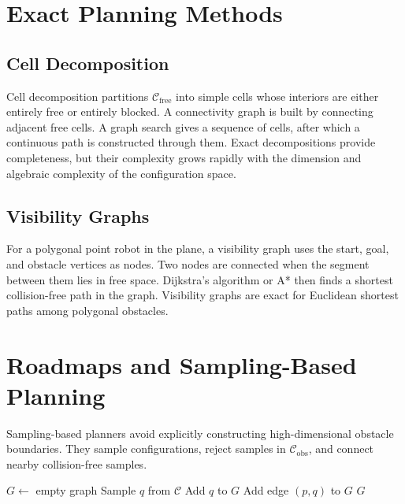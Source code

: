\section{Exact Planning Methods}
\label{sec:exact_motion_planning}

\subsection{Cell Decomposition}

Cell decomposition partitions $\mathcal{C}_{\mathrm{free}}$ into simple cells
whose interiors are either entirely free or entirely blocked. A connectivity
graph is built by connecting adjacent free cells. A graph search gives a
sequence of cells, after which a continuous path is constructed through them.
Exact decompositions provide completeness, but their complexity grows rapidly
with the dimension and algebraic complexity of the configuration space.

\subsection{Visibility Graphs}

For a polygonal point robot in the plane, a visibility graph uses the start,
goal, and obstacle vertices as nodes. Two nodes are connected when the segment
between them lies in free space. Dijkstra's algorithm or A* then finds a
shortest collision-free path in the graph. Visibility graphs are exact for
Euclidean shortest paths among polygonal obstacles.

\section{Roadmaps and Sampling-Based Planning}
\label{sec:sampling_motion_planning}

Sampling-based planners avoid explicitly constructing high-dimensional
obstacle boundaries. They sample configurations, reject samples in
$\mathcal{C}_{\mathrm{obs}}$, and connect nearby collision-free samples.

\begin{algorithm}[htbp]
\caption{Probabilistic Roadmap Planner}
\label{alg:probabilistic_roadmap}
\begin{algorithmic}[1]
  \State $G\gets$ empty graph
    \State Sample $q$ from $\mathcal{C}$
      \State Add $q$ to $G$
          \State Add edge $(p,q)$ to $G$
        \EndIf
      \EndFor
    \EndIf
  \EndFor
  \State \Return $G$
\EndFunction
\end{algorithmic}
\end{algorithm}


